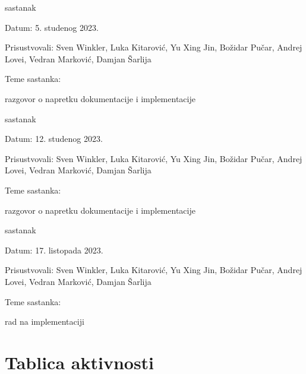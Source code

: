 \begin{packed_enum}
			\item  sastanak
			\item[] \begin{packed_item}
				\item Datum: 5. studenog 2023.
				\item Prisustvovali: Sven Winkler, Luka Kitarović, Yu Xing Jin, Božidar Pučar, Andrej Lovei, Vedran Marković, Damjan Šarlija
				\item Teme sastanka:
				\begin{packed_item}
					\item  razgovor o napretku dokumentacije i implementacije
				\end{packed_item}
			\end{packed_item}
			
			\item  sastanak
			\item[] \begin{packed_item}
				\item Datum: 12. studenog 2023.
				\item Prisustvovali: Sven Winkler, Luka Kitarović, Yu Xing Jin, Božidar Pučar, Andrej Lovei, Vedran Marković, Damjan Šarlija
				\item Teme sastanka:
				\begin{packed_item}
					\item  razgovor o napretku dokumentacije i implementacije
				\end{packed_item}
			\end{packed_item}
			
			\item  sastanak
			\item[] \begin{packed_item}
				\item Datum: 17. listopada 2023.
				\item Prisustvovali: Sven Winkler, Luka Kitarović, Yu Xing Jin, Božidar Pučar, Andrej Lovei, Vedran Marković, Damjan Šarlija
				\item Teme sastanka:
				\begin{packed_item}
					\item  rad na implementaciji
				\end{packed_item}
			\end{packed_item}
			
		\end{packed_enum}
		
		\eject
		\section*{Tablica aktivnosti}
		
